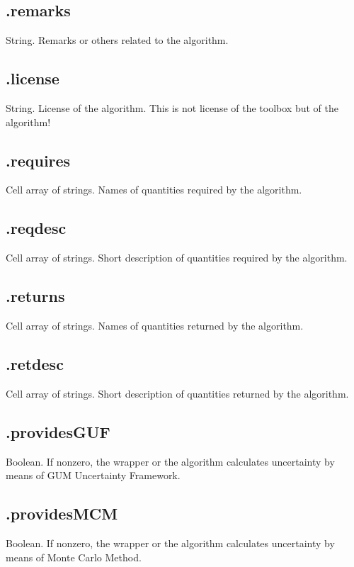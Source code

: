 \documentclass[12pt,a4paper,oneside]{report} %
\begin{document}
\subsection{\textsf{.remarks}} %
String. Remarks or others related to the algorithm.

\subsection{\textsf{.license}} %
String. License of the algorithm. This is not license of the toolbox but of the algorithm!

\subsection{\textsf{.requires}} %
Cell array of strings. Names of quantities required by the algorithm.

\subsection{\textsf{.reqdesc}} %
Cell array of strings. Short description of quantities required by the algorithm.

\subsection{\textsf{.returns}} %
Cell array of strings. Names of quantities returned by the algorithm.

\subsection{\textsf{.retdesc}} %
Cell array of strings. Short description of quantities returned by the algorithm.

\subsection{\textsf{.providesGUF}} %
Boolean. If nonzero, the wrapper or the algorithm calculates uncertainty by means of GUM Uncertainty
Framework.

\subsection{\textsf{.providesMCM}} %
Boolean. If nonzero, the wrapper or the algorithm calculates uncertainty by means of Monte Carlo
Method.
\end{document}
